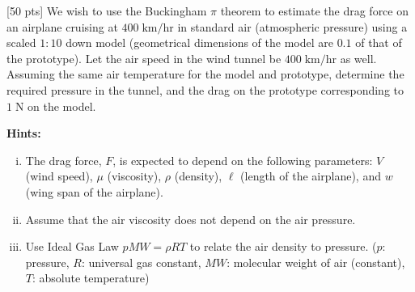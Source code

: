 \documentclass[12pt]{article}
\begin{document}



\begin{ex}

  [50 pts] We wish to use the Buckingham $\pi$ theorem to estimate the drag force on an airplane cruising at $400\;\mathrm{km/hr}$ in standard air (atmospheric pressure) using a scaled $1:10$ down model (geometrical dimensions of the model are $0.1$ of that of the prototype). Let the air speed in the wind tunnel be $400\;\mathrm{km/hr}$ as well. Assuming the same air temperature for the model and prototype, determine the required pressure in the tunnel, and the drag on the prototype corresponding to $1\;\mathrm{N}$ on the model.

\vspace{0.5cm}\noindent\textbf{Hints:}
\begin{enumerate}[(i)]
  \item The drag force, $F$, is expected to depend on the following parameters: $V$ (wind speed), $\mu$ (viscosity), $\rho$ (density), $\ell$ (length of the airplane), and $w$ (wing span of the airplane).
  \item Assume that the air viscosity does not depend on the air pressure.
  \item Use Ideal Gas Law $p MW=\rho R T$ to relate the air density to pressure. ($p$: pressure, $R$: universal gas constant, $MW$: molecular weight of air (constant), $T$: absolute temperature)
\end{enumerate}
		

\end{ex}
\end{document}
